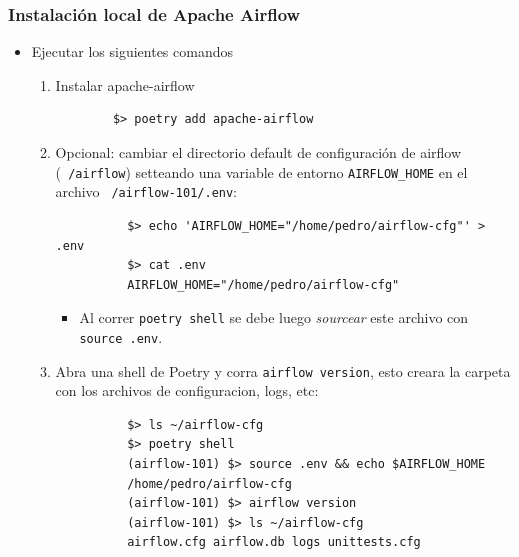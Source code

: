 \documentclass[leqno, 10pt, envcountsect]{beamer}
\numberwithin{equation}{section}
\theoremstyle{definition}
\theoremstyle{example}
\numberwithin{figure}{section}
\numberwithin{table}{section}
\let\olditem\item
\renewcommand{\item}{%
\olditem\vspace{1pt}}
\begin{document}
\begin{frame}[fragile=singleslide]
  \frametitle{Instalación local de Apache Airflow}
  \begin{itemize}
    \item Ejecutar los siguientes comandos
      \begin{enumerate}
        \item Instalar apache-airflow
        \begin{verbatim}
        $> poetry add apache-airflow
        \end{verbatim}
        \item Opcional: cambiar el directorio default de configuración de airflow
          (\texttt{~/airflow}) setteando una variable de entorno
          \texttt{AIRFLOW_HOME} en el archivo \texttt{~/airflow-101/.env}:
          \begin{verbatim}
          $> echo 'AIRFLOW_HOME="/home/pedro/airflow-cfg"' > .env
          $> cat .env
          AIRFLOW_HOME="/home/pedro/airflow-cfg"
          \end{verbatim}
          \begin{itemize}
            \item Al correr \texttt{poetry shell} se debe luego
              \textit{sourcear} este archivo con \texttt{source .env}.
          \end{itemize}
        \item Abra una shell de Poetry y corra \texttt{airflow version}, esto
          creara la carpeta con los archivos de configuracion, logs, etc:
          \begin{verbatim}
          $> ls ~/airflow-cfg
          $> poetry shell
          (airflow-101) $> source .env && echo $AIRFLOW_HOME
          /home/pedro/airflow-cfg
          (airflow-101) $> airflow version
          (airflow-101) $> ls ~/airflow-cfg
          airflow.cfg airflow.db logs unittests.cfg
          \end{verbatim}
      \end{enumerate}
  \end{itemize}
\end{frame}
\end{document}
